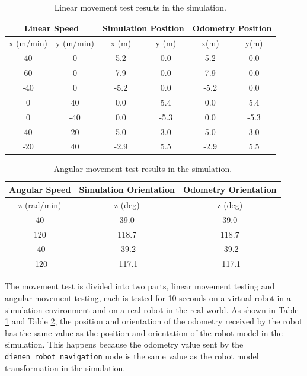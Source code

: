\begin{table}
  \caption{Linear movement test results in the simulation.}
  \label{tab:simulationlineartestresults}
  \centering
  \begin{tabular}{cc|cc|cc}
    \toprule
    \multicolumn{2}{c|}{Linear Speed} &
    \multicolumn{2}{|c|}{Simulation Position} &
    \multicolumn{2}{|c}{Odometry Position} \\
    \midrule
    x (m/min) & y (m/min) & x (m) & y (m) & x(m)  & y(m) \\
    \midrule
    40        & 0         & 5.2   & 0.0   & 5.2   & 0.0 \\
    60        & 0         & 7.9   & 0.0   & 7.9   & 0.0 \\
    -40       & 0         & -5.2  & 0.0   & -5.2  & 0.0 \\
    0         & 40        & 0.0   & 5.4   & 0.0   & 5.4 \\
    0         & -40       & 0.0   & -5.3  & 0.0   & -5.3 \\
    40        & 20        & 5.0   & 3.0   & 5.0   & 3.0 \\
    -20       & 40        & -2.9  & 5.5   & -2.9  & 5.5 \\
    \bottomrule
  \end{tabular}
\end{table}

\begin{table}
  \caption{Angular movement test results in the simulation.}
  \label{tab:simulationangulartestresults}
  \centering
  \begin{tabular}{c|c|c}
    \toprule
    Angular Speed   & Simulation Orientation & Odometry Orientation \\
    \midrule
    z (rad/min) & z (deg)               & z (deg) \\
    \midrule
    40          & 39.0                  & 39.0 \\
    120         & 118.7                 & 118.7 \\
    -40         & -39.2                 & -39.2 \\
    -120        & -117.1                & -117.1 \\
    \bottomrule
  \end{tabular}
\end{table}

The movement test is divided into two parts,
  linear movement testing and angular movement testing,
  each is tested for 10 seconds on a virtual robot in a simulation environment and on a real robot in the real world.
As shown in Table \ref{tab:simulationlineartestresults} and Table \ref{tab:simulationangulartestresults},
  the position and orientation of the odometry received by the robot has the same value as the position and orientation of the robot model in the simulation.
This happens because the odometry value sent by the \lstinline{dienen_robot_navigation} node is the same value as the robot model transformation in the simulation.

